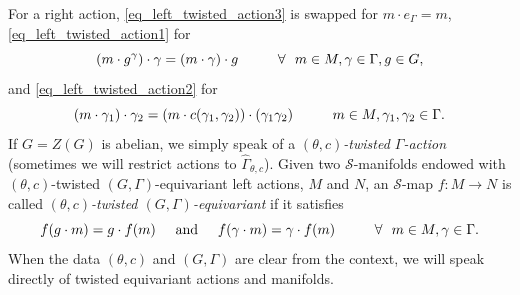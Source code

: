 For a right action, \eqref{eq_left_twisted_action3} is swapped for \(m\cdot e_\Gamma=m\),  \eqref{eq_left_twisted_action1}  for 
\begin{equation} \label{eq_right_twisted_action1}
(m\cdot g^\gamma)\cdot \gamma = (m \cdot \gamma)\cdot g \hspace{1 cm} \forall \ \ m \in M, \gamma \in \Gamma,  g \in G,
\end{equation}
and \eqref{eq_left_twisted_action2} for
\begin{equation} \label{eq_right_twisted_action2}
(m\cdot \gamma_1)\cdot \gamma_2 = (m\cdot c(\gamma_1, \gamma_2))\cdot (\gamma_1 \gamma _2) \hspace{1 cm} m \in M, \gamma_1, \gamma_2 \in \Gamma.
\end{equation}
If \(G=Z(G)\) is abelian, we simply speak of a \((\theta, c)\)\textit{-twisted \(\Gamma\)-action} (sometimes we will restrict actions to \(\hat{\Gamma}_{\theta, c}\)). Given two \(\mathcal{S}\)-manifolds endowed with \((\theta,c)\)-twisted \((G, \Gamma)\)-equivariant left actions, \(M\) and \(N\), an \(\mathcal{S}\)-map \(f\colon M \to N\) is called \textit{\((\theta, c)\)-twisted \((G, \Gamma)\)-equivariant} if it satisfies 
\begin{equation} \label{eq_def_twisted_equiv_map}
f(g \cdot m) = g\cdot f(m) \hspace{0.5 cm} \text{and} \hspace{0.5 cm} f(\gamma \cdot m)=\gamma \cdot f(m) \hspace{1 cm} \forall \ \ m \in M, \gamma \in \Gamma.
\end{equation}
When the data \((\theta, c)\) and \((G, \Gamma)\) are clear from the context, we will speak directly of twisted equivariant actions and manifolds. \\

